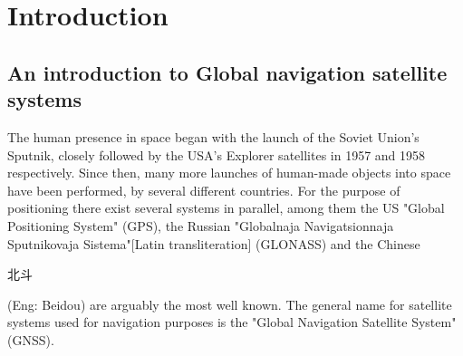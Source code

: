 

\chapter{Introduction}
\section{An introduction to Global navigation satellite systems}
The human presence in space began with the launch of the Soviet Union's Sputnik, closely followed by the USA's Explorer satellites in 1957 and 1958 respectively. Since then, many more launches of human-made objects into space have been performed, by several different countries. For the purpose of positioning there exist several systems in parallel, among them the US "Global Positioning System" (GPS), the Russian "Globalnaja Navigatsionnaja Sputnikovaja Sistema"[Latin transliteration] (GLONASS) and the Chinese \begin{CJK}{UTF8}{gbsn}北斗
\end{CJK}(Eng: Beidou) are arguably the most well known. The general name for satellite systems used for navigation purposes is the "Global Navigation Satellite System" (GNSS).
